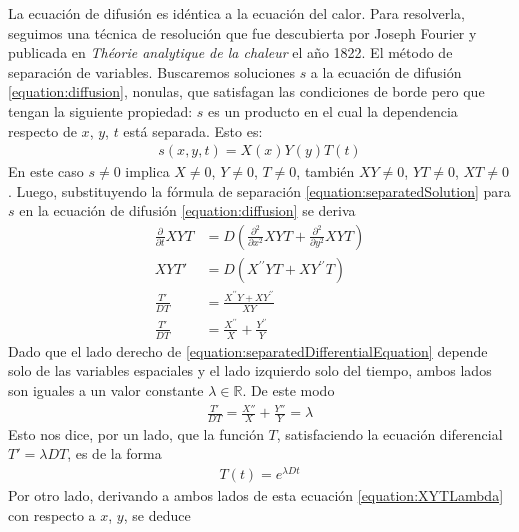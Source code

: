 \documentclass{article}
\newcommand{\realNumbers}{\mathbb{R}}
\begin{document}
  La ecuación de difusión es idéntica a la ecuación del calor.
  Para resolverla, seguimos una técnica de resolución que fue descubierta por Joseph Fourier y publicada en \emph{Théorie analytique de la chaleur} el año 1822.
  El método de separación de variables.
  Buscaremos soluciones \(s\) a la ecuación de difusión \eqref{equation:diffusion}, nonulas, que satisfagan las condiciones de borde pero que tengan la siguiente propiedad:
  \(s\) es un producto en el cual la dependencia respecto de \(x\), \(y\), \(t\) está separada.
  Esto es:
  \begin{align}
    \label{equation:separatedSolution}
    s(x, y, t)
    =
    X(x) Y(y) T(t)
  \end{align}
  En este caso \(s \neq 0\) implica \(X \neq 0\), \(Y \neq 0\), \(T \neq 0\), también \(X Y \neq 0\), \(Y T \neq 0\), \(X T \neq 0\).
  Luego, substituyendo la fórmula de separación \eqref{equation:separatedSolution} para \(s\) en la ecuación de difusión \eqref{equation:diffusion} se deriva
  \begin{align}
    \frac{\partial}{\partial t} X Y T
    &=
    D \left(
      \frac{\partial^2}{\partial x^2} X Y T
      +
      \frac{\partial^2}{\partial y^2} X Y T
    \right)
    \\
    X Y T'
    &=
    D \left(
      X^{\prime\prime} Y T
      +
      X Y^{\prime\prime} T
    \right)
    \\
    \frac{T'}{D T}
    &=
    \frac{X^{\prime\prime} Y + X Y^{\prime\prime}}{X Y}
    \\
    \label{equation:separatedDifferentialEquation}
    \frac{T'}{D T}
    &=
    \frac{X^{\prime\prime}}{X}
    +
    \frac{Y^{\prime\prime}}{Y}
  \end{align}
  Dado que el lado derecho de \eqref{equation:separatedDifferentialEquation} depende solo de las variables espaciales y el lado izquierdo solo del tiempo, ambos lados son iguales a un valor constante \(\lambda \in \realNumbers\).
  De este modo
  \begin{align}
    \label{equation:XYTLambda}
    \frac{T'}{D T}
    =
    \frac{X''}{X} + \frac{Y''}{Y}
    =
    \lambda
  \end{align}
  Esto nos dice, por un lado, que la función \(T\), satisfaciendo la ecuación diferencial \(T' = \lambda D T\), es de la forma
  \begin{align}
    T(t) = e^{\lambda D t}
  \end{align}
  Por otro lado, derivando a ambos lados de esta ecuación \eqref{equation:XYTLambda} con respecto a \(x\), \(y\), se deduce
\end{document}
